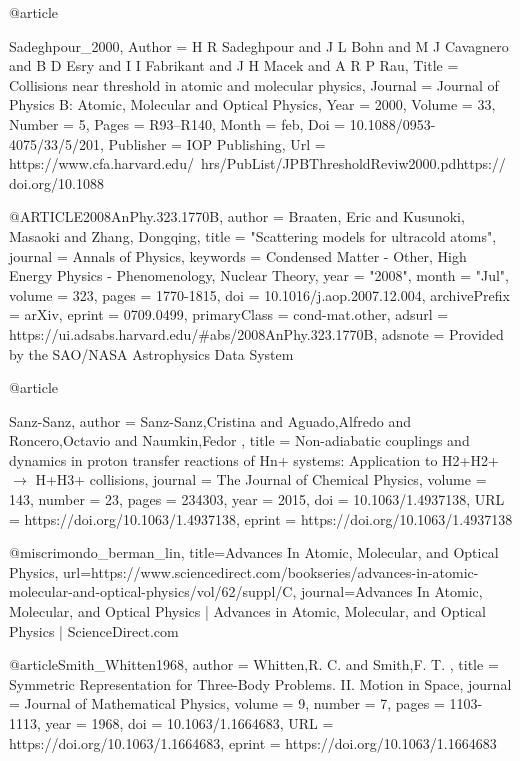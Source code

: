 @article{Sadeghpour_2000,
	Author = {H R Sadeghpour and J L Bohn and M J Cavagnero and B D Esry and I I Fabrikant and J H Macek and A R P Rau},
	Title = {Collisions near threshold in atomic and molecular physics},
	Journal = {Journal of Physics B: Atomic, Molecular and Optical Physics},
	Year = {2000},
	Volume = {33},
	Number = {5},
	Pages = {R93--R140},
	Month = {feb},
	Doi = {10.1088/0953-4075/33/5/201},
	Publisher = {{IOP} Publishing},
	Url = {https://www.cfa.harvard.edu/~hrs/PubList/JPBThresholdReviw2000.pdhttps://doi.org/10.1088%
}

@ARTICLE{2008AnPhy.323.1770B,
	author = {{Braaten}, Eric and {Kusunoki}, Masaoki and {Zhang}, Dongqing},
	title = "{Scattering models for ultracold atoms}",
	journal = {Annals of Physics},
	keywords = {Condensed Matter - Other, High Energy Physics - Phenomenology, Nuclear Theory},
	year = "2008",
	month = "Jul",
	volume = {323},
	pages = {1770-1815},
	doi = {10.1016/j.aop.2007.12.004},
	archivePrefix = {arXiv},
	eprint = {0709.0499},
	primaryClass = {cond-mat.other},
	adsurl = {https://ui.adsabs.harvard.edu/\#abs/2008AnPhy.323.1770B},
	adsnote = {Provided by the SAO/NASA Astrophysics Data System}
}


@article{Sanz-Sanz,
	author = {Sanz-Sanz,Cristina  and Aguado,Alfredo  and Roncero,Octavio  and Naumkin,Fedor },
	title = {Non-adiabatic couplings and dynamics in proton transfer reactions of Hn+ systems: Application to H2+H2+ $\rightarrow$ H+H3+ collisions},
	journal = {The Journal of Chemical Physics},
	volume = {143},
	number = {23},
	pages = {234303},
	year = {2015},
	doi = {10.1063/1.4937138},
	URL = {https://doi.org/10.1063/1.4937138},
	eprint = {https://doi.org/10.1063/1.4937138}
	
}

@misc{rimondo_berman_lin, 
	title={Advances In Atomic, Molecular, and Optical Physics}, url={https://www.sciencedirect.com/bookseries/advances-in-atomic-molecular-and-optical-physics/vol/62/suppl/C}, journal={Advances In Atomic, Molecular, and Optical Physics | Advances in Atomic, Molecular, and Optical Physics | ScienceDirect.com}
}	
	
@article{Smith_Whitten1968,
	author = {Whitten,R. C.  and Smith,F. T. },
	title = {Symmetric Representation for Three-Body Problems. II. Motion in Space},
	journal = {Journal of Mathematical Physics},
	volume = {9},
	number = {7},
	pages = {1103-1113},
	year = {1968},
	doi = {10.1063/1.1664683},
	URL = { 
	https://doi.org/10.1063/1.1664683},
	eprint = {https://doi.org/10.1063/1.1664683}
}

}
